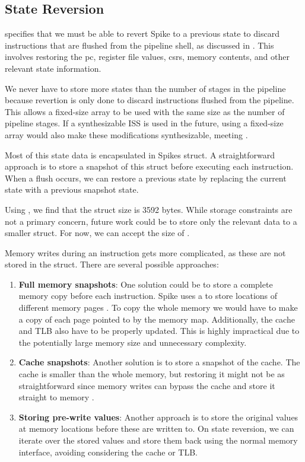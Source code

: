\subsection{State Reversion}%
\label{sec:iss_revert}

 specifies that we must be able to revert Spike to a previous state to discard instructions that are flushed from the pipeline shell, as discussed in . This involves restoring the \acrshort{pc}, register file values, \acrshort{csr}s, memory contents,  and other relevant state information. 

We never have to store more states than the number of stages in the pipeline because revertion is only done to discard instructions flushed from the pipeline. This allows a fixed-size array to be used with the same size as the number of pipeline stages. If a synthesizable ISS is used in the future, using a fixed-size array would also make these modifications synthesizable, meeting .

Most of this state data is encapsulated in Spikes  struct. A straightforward approach is to store a snapshot of this struct before executing each instruction. When a flush occurs, we can restore a previous state by replacing the current state with a previous snapshot state. 

Using , we find that the struct size is 3592 bytes. While storage constraints are not a primary concern, future work could be to store only the relevant data to a smaller struct. For now, we can accept the size of  . 

Memory writes during an instruction gets more complicated, as these are not stored in the  struct. There are several possible approaches:

\begin{enumerate}
    \item \textbf{Full memory snapshots}: One solution could be to store a complete memory copy before each instruction. Spike uses a  to store locations of different memory pages \cite{SpikeRISCVISA2023}. To copy the whole memory we would have to make a copy of each page pointed to by the memory map. Additionally, the cache and TLB also have to be properly updated. This is highly impractical due to the potentially large memory size and unnecessary complexity.
    \item \textbf{Cache snapshots}: Another solution is to store a snapshot of the cache. The cache is smaller than the whole memory, but restoring it might not be as straightforward since memory writes can bypass the cache and store it straight to memory \cite{hennessyComputerArchitectureQuantitative2019}.
    \item \textbf{Storing pre-write values}: Another approach is to store the original values at memory locations before these are written to. On state reversion, we can iterate over the stored values and store them back using the normal memory interface, avoiding considering the cache or TLB.
\end{enumerate}


